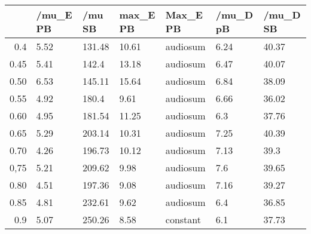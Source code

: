 \begin{table}[ht]
\centering
\begin{tabular}{rllllll}
  \hline
 & /mu\_E PB & /mu SB & max\_E PB & Max\_E PB & /mu\_D pB & /mu\_D SB \\ 
  \hline
0.4 & 5.52 & 131.48 & 10.61 & audiosum & 6.24 & 40.37 \\ 
  0.45 & 5.41 & 142.4 & 13.18 & audiosum & 6.47 & 40.07 \\ 
  0.50 & 6.53 & 145.11 & 15.64 & audiosum & 6.84 & 38.09 \\ 
  0.55 & 4.92 & 180.4 & 9.61 & audiosum & 6.66 & 36.02 \\ 
  0.60 & 4.95 & 181.54 & 11.25 & audiosum & 6.3 & 37.76 \\ 
  0.65 & 5.29 & 203.14 & 10.31 & audiosum & 7.25 & 40.39 \\ 
  0.70 & 4.26 & 196.73 & 10.12 & audiosum & 7.13 & 39.3 \\ 
  0,75 & 5.21 & 209.62 & 9.98 & audiosum & 7.6 & 39.65 \\ 
  0.80 & 4.51 & 197.36 & 9.08 & audiosum & 7.16 & 39.27 \\ 
  0.85 & 4.81 & 232.61 & 9.62 & audiosum & 6.4 & 36.85 \\ 
  0.9 & 5.07 & 250.26 & 8.58 & constant & 6.1 & 37.73 \\ 
   \hline
\end{tabular}
\end{table}
